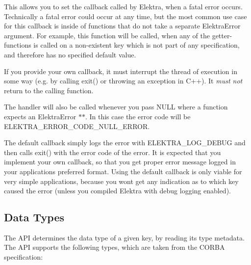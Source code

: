 This allows you to set the callback called by Elektra, when a fatal error occurs. Technically a fatal error could occur at any time, but the most common use case for this callback is inside of functions that do not take a separate {\ttfamily Elektra\+Error} argument. For example, this function will be called, when any of the getter-\/functions is called on a non-\/existent key which is not part of any specification, and therefore has no specified default value.

If you provide your own callback, it must interrupt the thread of execution in some way (e.\+g. by calling {\ttfamily exit()} or throwing an exception in C++). It {\itshape must not} return to the calling function.

The handler will also be called whenever you pass {\ttfamily N\+U\+LL} where a function expects an {\ttfamily Elektra\+Error $\ast$$\ast$}. In this case the error code will be {\ttfamily E\+L\+E\+K\+T\+R\+A\+\_\+\+E\+R\+R\+O\+R\+\_\+\+C\+O\+D\+E\+\_\+\+N\+U\+L\+L\+\_\+\+E\+R\+R\+OR}.

The default callback simply logs the error with {\ttfamily E\+L\+E\+K\+T\+R\+A\+\_\+\+L\+O\+G\+\_\+\+D\+E\+B\+UG} and then calls {\ttfamily exit()} with the error code of the error. It is expected that you implement your own callback, so that you get proper error message logged in your applications preferred format. Using the default callback is only viable for very simple applications, because you won\textquotesingle{}t get any indication as to which key caused the error (unless you compiled Elektra with debug logging enabled).

\label{_data-types}%


\subsection*{Data Types}

The A\+PI determines the data type of a given key, by reading its {\ttfamily type} metadata. The A\+PI supports the following types, which are taken from the C\+O\+R\+BA specification\+:


